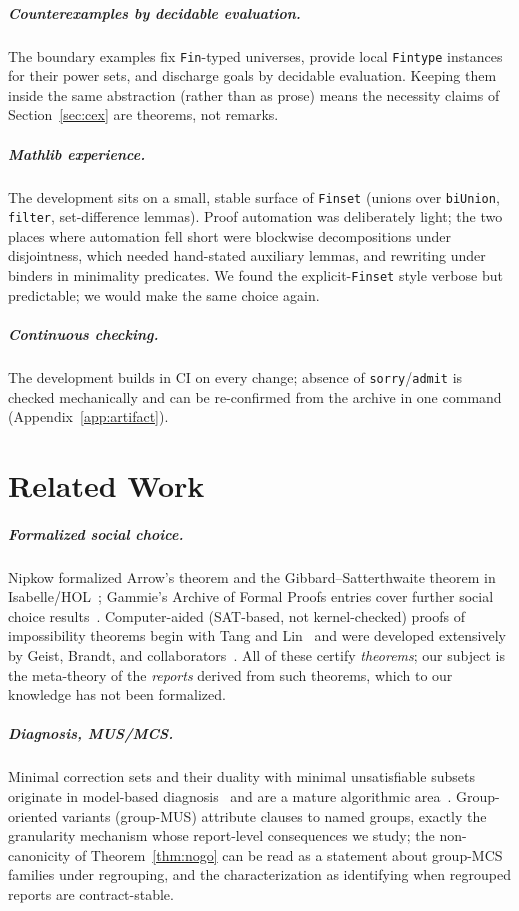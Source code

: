 \documentclass[sigplan,10pt,review,anonymous,nonacm]{acmart}
\theoremstyle{acmdefinition}
\newcommand{\code}[1]{\texttt{#1}}
\begin{document}
\subparagraph*{Counterexamples by decidable evaluation.} The boundary
examples fix \code{Fin}-typed universes, provide local \code{Fintype}
instances for their power sets, and discharge goals by decidable evaluation.
Keeping them inside the same abstraction (rather than as prose) means the
necessity claims of Section~\ref{sec:cex} are theorems, not remarks.

\subparagraph*{Mathlib experience.} The development sits on a small, stable
surface of \code{Finset} (unions over \code{biUnion}, \code{filter},
set-difference lemmas). Proof automation was deliberately light; the two
places where automation fell short were blockwise decompositions under
disjointness, which needed hand-stated auxiliary lemmas, and rewriting under
binders in minimality predicates. We found the explicit-\code{Finset} style
verbose but predictable; we would make the same choice again.

\subparagraph*{Continuous checking.}
The development builds in CI on every
change; absence of \code{sorry}/\code{admit} is checked mechanically and can
be re-confirmed from the archive in one command
(Appendix~\ref{app:artifact}).

\section{Related Work}
\label{sec:related}

\subparagraph*{Formalized social choice.} Nipkow formalized Arrow's theorem
and the Gibbard--Satterthwaite theorem in Isabelle/HOL~\cite{Nipkow2009};
Gammie's Archive of Formal Proofs entries cover further social choice
results~\cite{GammieAFP}. Computer-aided (SAT-based, not kernel-checked)
proofs of impossibility theorems begin with Tang and
Lin~\cite{TangLin2009} and were developed extensively by Geist, Brandt, and
collaborators~\cite{GeistEndriss2011,BrandtGeist2016}. All of these certify
\emph{theorems}; our subject is the meta-theory of the \emph{reports}
derived from such theorems, which to our knowledge has not been formalized.

\subparagraph*{Diagnosis, MUS/MCS.} Minimal correction sets and their duality
with minimal unsatisfiable subsets originate in model-based
diagnosis~\cite{Reiter1987} and are a mature algorithmic
area~\cite{LiffitonSakallah2008,MarquesSilva2013}. Group-oriented variants
(group-MUS) attribute clauses to named groups, exactly the granularity
mechanism whose report-level consequences we study;
the non-canonicity of
Theorem~\ref{thm:nogo} can be read as a statement about group-MCS families
under regrouping, and the characterization as identifying when regrouped
reports are contract-stable.
\end{document}
